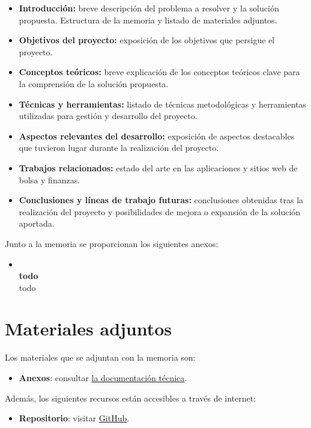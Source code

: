 \begin{itemize}
\tightlist
\item
  \textbf{Introducción:} breve descripción del problema a resolver y la
  solución propuesta. Estructura de la memoria y listado de materiales
  adjuntos.
\item
  \textbf{Objetivos del proyecto:} exposición de los objetivos que
  persigue el proyecto.
\item
  \textbf{Conceptos teóricos:} breve explicación de los conceptos
  teóricos clave para la comprensión de la solución propuesta.
\item
  \textbf{Técnicas y herramientas:} listado de técnicas metodológicas y
  herramientas utilizadas para gestión y desarrollo del proyecto.
\item
  \textbf{Aspectos relevantes del desarrollo:} exposición de aspectos
  destacables que tuvieron lugar durante la realización del proyecto.
\item
  \textbf{Trabajos relacionados:} estado del arte en las aplicaciones y sitios web de bolsa y finanzas.
\item
  \textbf{Conclusiones y líneas de trabajo futuras:} conclusiones
  obtenidas tras la realización del proyecto y posibilidades de mejora o
  expansión de la solución aportada.
\end{itemize}
Junto a la memoria se proporcionan los siguientes anexos:

\begin{itemize}
\tightlist
\item
  \textbf{\\todo} \\todo
\end{itemize}

\section{Materiales adjuntos}\label{materiales-adjuntos}

Los materiales que se adjuntan con la memoria son: 

\begin{itemize}
\item
	\textbf{Anexos}: consultar \href{https://github.com/rmt0009alu/FAT/blob/main/docs/latex/anexos.pdf}{la documentación técnica}.

\end{itemize}

Además, los siguientes recursos están accesibles a través de internet:

\begin{itemize}
\item
  \textbf{Repositorio}: visitar \href{}{GitHub}.
\end{itemize}



